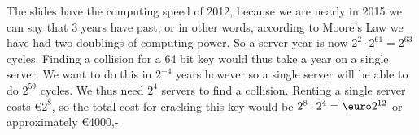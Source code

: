 The slides have the computing speed of 2012, because we are nearly in 2015 we can say that 3 years have past, or in other words, according to Moore's Law we have had two doublings of computing power. So a server year is now $2^2 \cdot 2^{61} = 2^{63}$ cycles. Finding a collision for a 64 bit key would thus take a year on a single server. We want to do this in $2^{-4}$ years however so a single server will be able to do $2^{59}$ cycles. We thus need $2^4$ servers to find a collision. Renting a single server costs \euro $2^8$, so the total cost for cracking this key would be $2^8 \cdot 2^4 =\mbox{\euro} 2^{12}$ or approximately \euro 4000,-